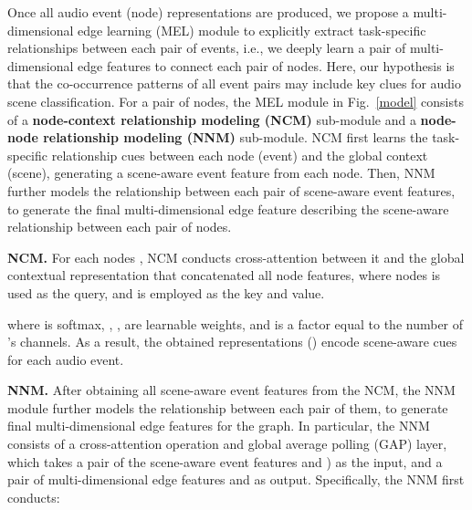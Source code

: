 \documentclass{article}
\begin{document}
\vspace{-0.2cm}
Once all audio event (node) representations are produced, we propose a multi-dimensional edge learning (MEL) module to explicitly extract task-specific relationships between each pair of events, i.e., we deeply learn a pair of multi-dimensional edge features to connect each pair of nodes. Here, our hypothesis is that the co-occurrence patterns of all event pairs may include key clues for audio scene classification. For a pair of nodes, the MEL module in Fig.~\ref{model} consists of a \textbf{node-context relationship modeling (NCM)} sub-module and a \textbf{node-node relationship modeling (NNM)} sub-module. NCM first learns the task-specific relationship cues between each node (event) and the global context (scene), generating a scene-aware event feature from each node. Then, NNM further models the relationship between each pair of scene-aware event features, to generate the final multi-dimensional edge feature describing the scene-aware relationship between each pair of nodes.

 


















\textbf{NCM.} For each nodes , NCM conducts cross-attention \cite{Transformer} between it and the global contextual representation  that concatenated all node features, where nodes  is used as the query, and  is employed as the key and value.
 
 
where  is softmax, , ,  are learnable weights, and  is a factor equal to the number of 's channels. As a result, the obtained representations  () encode scene-aware cues for each audio event.
















\textbf{NNM.} After obtaining all scene-aware event features from the NCM, the NNM module further models the relationship between each pair of them, to generate final multi-dimensional edge features for the graph. In particular, the NNM consists of a cross-attention operation and global average polling (GAP) layer, which takes a pair of the scene-aware event features  and ) as the input, and a pair of multi-dimensional edge features  and  as output. Specifically, the NNM first conducts: 
 
\end{document}
